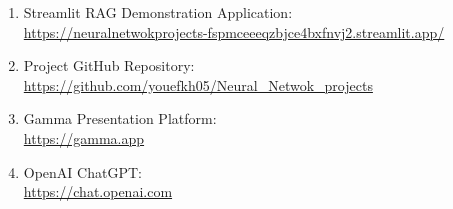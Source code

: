 \documentclass[12pt,a4paper]{article}
\begin{document}
\begin{enumerate}

\item Streamlit RAG Demonstration Application:\\
\url{https://neuralnetwokprojects-fspmceeeqzbjce4bxfnvj2.streamlit.app/}

\item Project GitHub Repository:\\
\url{https://github.com/youefkh05/Neural_Netwok_projects}

\item Gamma Presentation Platform:\\
\url{https://gamma.app}

\item OpenAI ChatGPT:\\
\url{https://chat.openai.com}

\end{enumerate}
\end{document}
